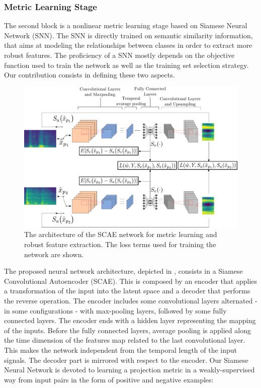 \subsubsection{Metric Learning Stage}
The second block is a nonlinear metric learning stage based on Siamese Neural Network (SNN). The SNN is directly trained on semantic similarity information, that aims at modeling the relationships between classes in order to extract more robust features. The proficiency of a SNN mostly depends on the objective function used to train the network as well as the training set selection strategy. Our contribution consists in defining these two aspects. 
\begin{figure}
	\includegraphics[width=\linewidth]{img/eeai/Siamese_approach}
	\caption{The architecture of the SCAE network for metric learning and robust feature extraction. The loss terms used for training the network are shown.}
	\label{fig:proposed_approach}
	
\end{figure}
The proposed neural network architecture, depicted in , consists in a Siamese Convolutional Autoencoder (SCAE). This is composed by an encoder that applies a transformation of the input into the latent space and a decoder that performs the reverse operation. The encoder includes some convolutional layers alternated - in some configurations - with max-pooling layers, followed by some fully connected layers. The encoder ends with a hidden layer representing the mapping of the inputs. Before the fully connected layers, average pooling is applied along the time dimension of the features map related to the last convolutional layer. This makes the network independent from the temporal length of the input signals. The decoder part is mirrored with respect to the encoder. 
Our Siamese Neural Network is devoted to learning a projection metric in a weakly-supervised way from input pairs in the form of positive and negative examples: 	

